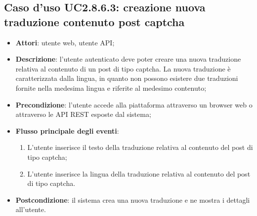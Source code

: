 \subsection{Caso d'uso UC2.8.6.3: creazione nuova traduzione contenuto post captcha}
\begin{itemize}
\item \textbf{Attori}: utente web, utente API;
\item \textbf{Descrizione}: l'utente autenticato deve poter creare una nuova traduzione relativa al contenuto di un post di tipo captcha. La nuova traduzione è caratterizzata dalla lingua, in quanto non possono esistere due traduzioni fornite nella medesima lingua e riferite al medesimo contenuto; 
      \item \textbf{Precondizione}: l'utente accede alla piattaforma attraverso un browser web o attraverso le API REST esposte dal sistema;

        \item \textbf{Flusso principale degli eventi}:
          \begin{enumerate}
          \item L'utente inserisce il testo della traduzione relativa al contenuto del post di tipo captcha;
          \item L'utente inserisce la lingua della traduzione relativa al contenuto del post di tipo captcha.

      \end{enumerate}
    \item \textbf{Postcondizione}: il sistema crea una nuova traduzione e ne mostra i dettagli all'utente.
  \end{itemize}
\hypertarget{UC2.8.6.4}{}
